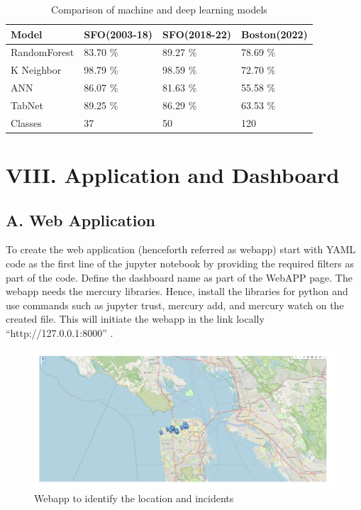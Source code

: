 \documentclass[conference,final, 10pt]{IEEEtran}
\begin{document}
\begin{table}
\centering
\caption{\label{tab:unnamed-chunk-17}Comparison of machine and deep learning models}
\centering
\begin{tabular}[t]{l|l|l|l}
\hline
Model & SFO(2003-18) & SFO(2018-22) & Boston(2022)\\
\hline
RandomForest & 83.70 \% & 89.27 \% & 78.69 \%\\
\hline
K Neighbor & 98.79 \% & 98.59 \% & 72.70 \%\\
\hline
ANN & 86.07 \% & 81.63 \% & 55.58 \%\\
\hline
TabNet & 89.25 \% & 86.29 \% & 63.53 \%\\
\hline
Classes & 37 & 50 & 120\\
\hline
\end{tabular}
\end{table}

\section{VIII. Application and
Dashboard}\label{viii.-application-and-dashboard}

\subsection{A. Web Application}\label{a.-web-application}

To create the web application (henceforth referred as webapp) start with
YAML code as the first line of the jupyter notebook by providing the
required filters as part of the code. Define the dashboard name as part
of the WebAPP page. The webapp needs the mercury libraries. Hence,
install the libraries for python and use commands such as jupyter trust,
mercury add, and mercury watch on the created file. This will initiate
the webapp in the link locally ``http://127.0.0.1:8000'' .

\begin{figure}

{\centering \includegraphics[width=0.95\linewidth]{img/fig14a} 

}

\caption{Webapp to identify the location and incidents}\label{fig:unnamed-chunk-18}
\end{figure}
\end{document}
